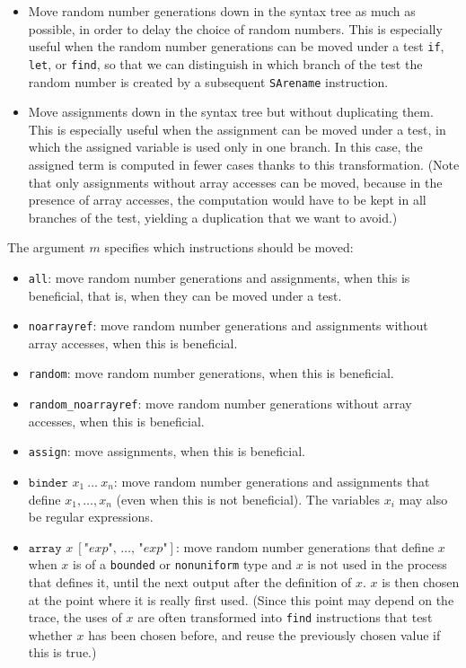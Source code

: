 \documentclass{article}
\begin{document}
\begin{itemize}
\begin{itemize}
\item Move random number generations down in the syntax tree as much
  as possible, in order to delay the choice of random numbers. This is
  especially useful when the random number generations can be moved
  under a test {\tt if}, {\tt let}, or {\tt find}, so that we can
  distinguish in which branch of the test the random number is created
  by a subsequent \texttt{SArename} instruction.

\item Move assignments down in the syntax tree but without duplicating
  them. This is especially useful when the assignment can be moved
  under a test, in which the assigned variable is used only in one
  branch. In this case, the assigned term is computed in fewer cases
  thanks to this transformation.
  (Note that only assignments without array accesses can be moved,
  because in the presence of array accesses, the computation would have
  to be kept in all branches of the test, yielding a duplication that 
  we want to avoid.)

\end{itemize}
The argument $m$ specifies which instructions should be moved:
\begin{itemize}
\item \texttt{all}: move random number generations and assignments,
when this is beneficial, that is, when they can be moved under a test.
\item \texttt{noarrayref}: move random number generations and assignments
without array accesses, when this is beneficial.
\item \texttt{random}: move random number generations, when this is beneficial.
\item \texttt{random\string_noarrayref}: move random number generations 
without array accesses, when this is beneficial.
\item \texttt{assign}: move assignments, when this is beneficial.
\item $\texttt{binder }x_1\ \dots\ x_n$: move random number generations and assignments
that define $x_1, \ldots, x_n$ (even when this is not beneficial).
The variables $x_i$ may also be regular expressions.
\item $\texttt{array }x\ [\texttt{"}exp\texttt{", }\dots\texttt{, "}exp\texttt{"}]$: 
move random number generations that define $x$
when $x$ is of a {\tt bounded} or {\tt nonuniform} type and $x$ is not used in
the process that defines it, until the next output after the definition of $x$.
$x$ is then chosen at the point where it is really first used. 
(Since this point may depend on the trace, the uses of $x$ are often
transformed into {\tt find} instructions that test whether $x$ has been 
chosen before, and reuse the previously chosen value if this is true.)


\end{itemize}
\end{itemize}
\end{document}
